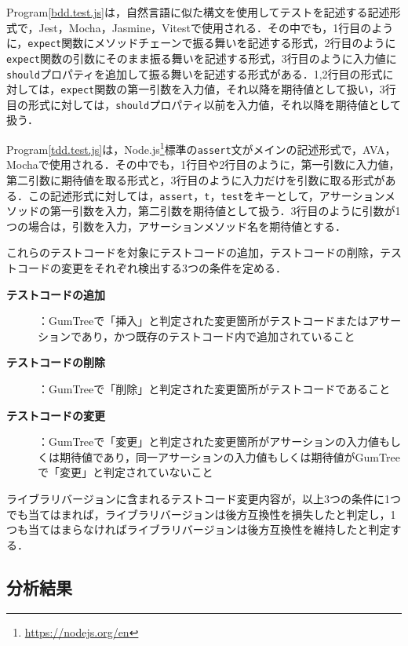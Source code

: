 \documentclass[submit]{ipsj}
\begin{document}
Program\ref{bdd.test.js}は，自然言語に似た構文を使用してテストを記述する記述形式で，Jest，Mocha，Jasmine，Vitestで使用される．その中でも，1行目のように，{\verb|expect|}関数にメソッドチェーンで振る舞いを記述する形式，2行目のように{\verb|expect|}関数の引数にそのまま振る舞いを記述する形式，3行目のように入力値に{\verb|should|}プロパティを追加して振る舞いを記述する形式がある．1,2行目の形式に対しては，{\verb|expect|}関数の第一引数を入力値，それ以降を期待値として扱い，3行目の形式に対しては，{\verb|should|}プロパティ以前を入力値，それ以降を期待値として扱う．


Program\ref{tdd.test.js}は，Node.js\footnote{\url{https://nodejs.org/en}}標準の{\verb|assert|}文がメインの記述形式で，AVA，Mochaで使用される．その中でも，1行目や2行目のように，第一引数に入力値，第二引数に期待値を取る形式と，3行目のように入力だけを引数に取る形式がある．この記述形式に対しては，{\verb|assert|}，{\verb|t|}，{\verb|test|}をキーとして，アサーションメソッドの第一引数を入力，第二引数を期待値として扱う．3行目のように引数が1つの場合は，引数を入力，アサーションメソッド名を期待値とする．

これらのテストコードを対象にテストコードの追加，テストコードの削除，テストコードの変更をそれぞれ検出する3つの条件を定める．

\begin{description}
  \item[\textbf{テストコードの追加}]：GumTreeで「挿入」と判定された変更箇所がテストコードまたはアサーションであり，かつ既存のテストコード内で追加されていること
  \item[\textbf{テストコードの削除}]：GumTreeで「削除」と判定された変更箇所がテストコードであること
  \item[\textbf{テストコードの変更}]：GumTreeで「変更」と判定された変更箇所がアサーションの入力値もしくは期待値であり，同一アサーションの入力値もしくは期待値がGumTreeで「変更」と判定されていないこと
\end{description}

ライブラリバージョンに含まれるテストコード変更内容が，以上3つの条件に1つでも当てはまれば，ライブラリバージョンは後方互換性を損失したと判定し，1つも当てはまらなければライブラリバージョンは後方互換性を維持したと判定する．

\subsection{分析結果}

\end{document}
